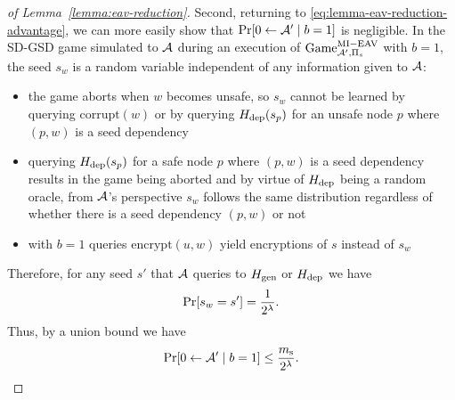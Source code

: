 \begin{proof}[of Lemma~\ref{lemma:eav-reduction}]
	Second, returning to \eqref{eq:lemma-eav-reduction-advantage}, we can more easily show that $\pr{0 \from \adv' \mid b = 1}$ is negligible. In the SD-GSD game simulated to $\mathcal{A}$ during an execution of $\mathrm{Game}_{\mathcal{A}', \Pi_s}^{\mathrm{MI-EAV}}$ with $b = 1$, the seed $s_w$ is a random variable independent of any information given to $\mathcal{A}$:
	\begin{itemize}
		\item the game aborts when $w$ becomes unsafe, so $s_w$ cannot be learned by querying $\mathrm{corrupt}(w)$ or by querying $H_\mathrm{dep}(s_p)$ for an unsafe node $p$ where $(p, w)$ is a seed dependency
		\item querying $H_\mathrm{dep}(s_p)$ for a safe node $p$ where $(p, w)$ is a seed dependency results in the game being aborted and by virtue of $H_\mathrm{dep}$ being a random oracle, from $\mathcal{A}$'s perspective $s_w$ follows the same distribution regardless of whether there is a seed dependency $(p, w)$ or not
		\item with $b = 1$ queries $\mathrm{encrypt}(u, w)$ yield encryptions of $s$ instead of $s_w$
	\end{itemize}
	Therefore, for any seed $s'$ that $\mathcal{A}$ queries to $H_\mathrm{gen}$ or $H_\mathrm{dep}$ we have
	\[
		\pr{s_w = s'} = \frac{1}{2^\lambda}.
	\]
	Thus, by a union bound we have
	\begin{equation} \label{eq:lemma-eav-reduction-b=1}
		\pr{0 \from \adv' \mid b = 1} \le \frac{\ms}{2^\lambda}.
	\end{equation}


\end{proof}
